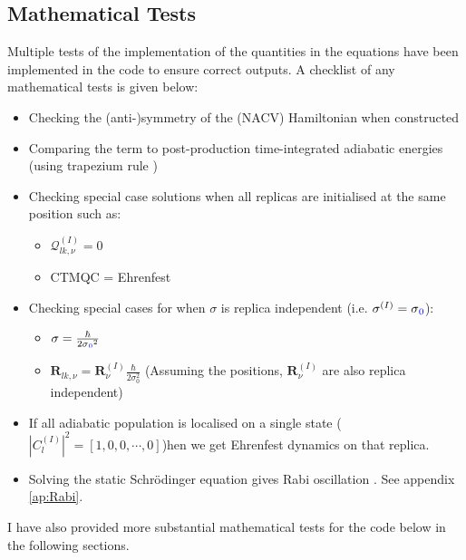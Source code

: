 \subsection{Mathematical Tests}
Multiple tests of the implementation of the quantities in the equations have been implemented in the code to ensure correct outputs. A checklist of any mathematical tests is given below:
\begin{itemize}
  \item Checking the (anti-)symmetry of the (NACV) Hamiltonian when constructed
  
  \item Comparing the   term to post-production time-integrated adiabatic energies (using trapezium rule \cite{NumericalAnalysis})
  
  \item Checking special case solutions when all replicas are initialised at the same position such as:
	\begin{itemize}
	  \item $\mathcal{Q}_{lk, \nu}^{(I)} = 0$
	  \item CTMQC = Ehrenfest
	\end{itemize}

\item Checking special cases for when $\sigma$ is replica independent (i.e. $\sigma^{(I)} = \sigma\textcolor{blue}{_{0}}$):
	\begin{itemize}
		\item $\sigma = \frac{\hbar}{2 \sigma\textcolor{blue}{_{0}}^2}$
	  \item $\mathbf{R}_{lk, \nu} = \mathbf{R}_{\nu}^{(I)} \frac{\hbar}{2 \sigma_0^2}$ (Assuming the positions, $\mathbf{R}_{\nu}^{(I)}$ are also replica independent)
	\end{itemize}

\item If all adiabatic population is localised on a single state ($|C_{l}^{(I)}|^2 = [1, 0, 0, \cdots, 0]$)hen we get Ehrenfest dynamics on that replica.
  \item Solving the static Schr\"odinger equation gives Rabi oscillation \cite{FeynmanLectVol3}. See appendix \ref{ap:Rabi}.
\end{itemize}

I have also provided  \remove{(} more substantial\remove{)} mathematical tests for the code below in the following sections.
